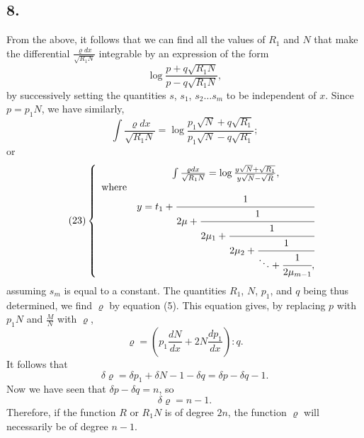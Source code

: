 \documentclass[oneside, 12 pt, leqno]{memoir}
\begin{document}
\subsection*{8.}

From the above, it follows that we can find all the values of \(R_1\) and \(N\) that make the differential \(\frac{\varrho dx}{\sqrt{R_1 N}}\) integrable by an expression of the form
\[\log \frac{p+q \sqrt{R_1 N}}{p-q \sqrt{ R_1 N}},\]
by successively setting the quantities \(s\), \(s_1\), \(s_2 \dots s_m\) to be independent of \(x\).
%
Since \(p=p_1 N\), we have similarly,
\[\int \frac{\varrho d x}{\sqrt{R_1 N}}=\log \frac{p_1 \sqrt{ N }+q \sqrt{R_1}}{p_1 \sqrt{ N }-q \sqrt{R_1}};\]
or
\[\tag{23} \left\{ \begin{array}{lc} & \int \frac{\varrho dx}{\sqrt{R_1N}} = \log \frac{y \sqrt{N} + \sqrt{R_1}}{y\sqrt{N} - \sqrt{R}},\\ \text{where} \\ &y = t_1 + \cfrac{1}{2\mu+\cfrac{1}{2\mu_1 + \cfrac{1}{2\mu_2+\cfrac{1}{\ddots + \cfrac{1}{2\mu_{m-1}},}}}} \end{array} \right.\]
assuming \(s_m\) is equal to a constant.
%
The quantities \(R_1\), \(N\), \(p_1\), and \(q\) being thus determined, we find \(\varrho\) by equation (5). This equation gives, by replacing \(p\) with \(p_1 N\) and \(\frac{M}{N}\) with \(\varrho\),
\[\varrho=\left(p_1 \frac{d N}{d x}+2 N \frac{d p_1}{d x}\right): q.\]
It follows that
\[\delta \varrho=\delta p_1+\delta N-1-\delta q=\delta p-\delta q-1.\]
Now we have seen that \(\delta p-\delta q=n\), so
\[\delta \varrho=n-1.\]
Therefore, if the function \(R\) or \(R_1 N\) is of degree \(2n\), the function \(\varrho\) will necessarily be of degree \(n-1\).
%
\end{document}

